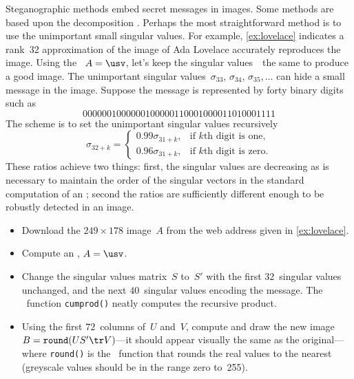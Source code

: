 \begin{OmitV1}
\begin{exercise}  
 Steganographic methods embed secret messages in images.
Some methods are based upon the  decomposition \cite[e.g.,][]{Gorodetski2001}. %
Perhaps the most straightforward method is to use the unimportant small singular values.
For example, \cref{ex:lovelace} indicates a rank~32 approximation of the image of Ada Lovelace accurately reproduces the image.
Using the \svd\ \(A=\usv\), let's keep the singular values~\hlist{}\ the same to produce a good image.
The unimportant singular values~\(\sigma_{33}\), \(\sigma_{34}\), \(\sigma_{35},\ldots\) can hide a small message in the image.
Suppose the message is represented by forty binary digits such as
\begin{equation*}
0000001000000100000110001000011010001111
\end{equation*}
The scheme is to set the unimportant singular values recursively
\begin{equation*}
\sigma_{32+k}=\begin{cases}0.99\sigma_{31+k},
&\text{if \(k\)th digit is one},
\\0.96\sigma_{31+k},
&\text{if \(k\)th digit is zero}.
\end{cases}
\end{equation*}
These ratios achieve two things: first, the singular values are decreasing as is necessary to maintain the order of the singular vectors in the standard computation of an \svd; second the ratios are sufficiently different enough to be robustly detected in an image.
\begin{itemize}
\item Download the \(249\times178\) image~\(A\) from the web address given in \cref{ex:lovelace}.

\item Compute an \svd, \(A=\usv\).

\item Change the singular values matrix~\(S\) to~\(S'\) with the first \(32\)~singular values unchanged, and the next \(40\)~singular values encoding the message.
The \script\ function \verb|cumprod()| neatly computes the recursive product.

\item Using the first \(72\)~columns of~\(U\) and~\(V\), compute and draw the new image \(B=\verb|round|(US'\tr V)\)---it should appear visually the same as the original---%
where \verb|round()| is the \script\ function that rounds the real values to the nearest  (greyscale values should be in the range zero to~255). 


\end{itemize}
\end{exercise}
\end{OmitV1}
